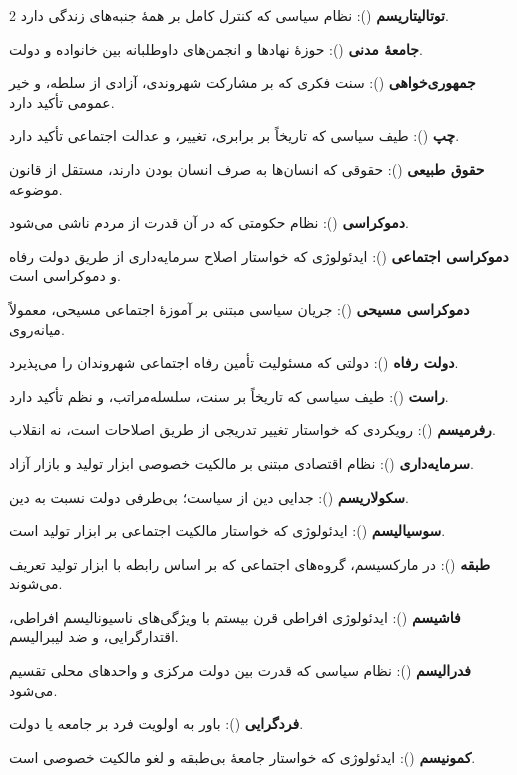 \begin{multicols}{2}
\textbf{توتالیتاریسم} (): نظام سیاسی که کنترل کامل بر همهٔ جنبه‌های زندگی دارد.

\textbf{جامعهٔ مدنی} (): حوزهٔ نهادها و انجمن‌های داوطلبانه بین خانواده و دولت.

\textbf{جمهوری‌خواهی} (): سنت فکری که بر مشارکت شهروندی، آزادی از سلطه، و خیر عمومی تأکید دارد.

\textbf{چپ} (): طیف سیاسی که تاریخاً بر برابری، تغییر، و عدالت اجتماعی تأکید دارد.

\textbf{حقوق طبیعی} (): حقوقی که انسان‌ها به صرف انسان بودن دارند، مستقل از قانون موضوعه.

\textbf{دموکراسی} (): نظام حکومتی که در آن قدرت از مردم ناشی می‌شود.

\textbf{دموکراسی اجتماعی} (): ایدئولوژی که خواستار اصلاح سرمایه‌داری از طریق دولت رفاه و دموکراسی است.

\textbf{دموکراسی مسیحی} (): جریان سیاسی مبتنی بر آموزهٔ اجتماعی مسیحی، معمولاً میانه‌روی.

\textbf{دولت رفاه} (): دولتی که مسئولیت تأمین رفاه اجتماعی شهروندان را می‌پذیرد.

\textbf{راست} (): طیف سیاسی که تاریخاً بر سنت، سلسله‌مراتب، و نظم تأکید دارد.

\textbf{رفرمیسم} (): رویکردی که خواستار تغییر تدریجی از طریق اصلاحات است، نه انقلاب.

\textbf{سرمایه‌داری} (): نظام اقتصادی مبتنی بر مالکیت خصوصی ابزار تولید و بازار آزاد.

\textbf{سکولاریسم} (): جدایی دین از سیاست؛ بی‌طرفی دولت نسبت به دین.

\textbf{سوسیالیسم} (): ایدئولوژی که خواستار مالکیت اجتماعی بر ابزار تولید است.

\textbf{طبقه} (): در مارکسیسم، گروه‌های اجتماعی که بر اساس رابطه با ابزار تولید تعریف می‌شوند.

\textbf{فاشیسم} (): ایدئولوژی افراطی قرن بیستم با ویژگی‌های ناسیونالیسم افراطی، اقتدارگرایی، و ضد لیبرالیسم.

\textbf{فدرالیسم} (): نظام سیاسی که قدرت بین دولت مرکزی و واحدهای محلی تقسیم می‌شود.

\textbf{فردگرایی} (): باور به اولویت فرد بر جامعه یا دولت.

\textbf{کمونیسم} (): ایدئولوژی که خواستار جامعهٔ بی‌طبقه و لغو مالکیت خصوصی است.


\end{multicols}
